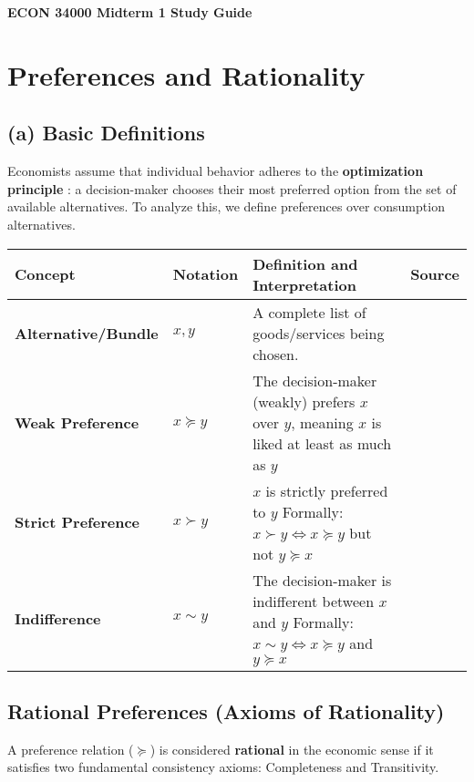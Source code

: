 \documentclass{article}
\begin{document}
\begin{center}
    {\Huge \textbf{ECON 34000 Midterm 1 Study Guide}}
\end{center}

\tableofcontents

\pagebreak
\section{Preferences and Rationality}

\subsection*{ (a) Basic Definitions}

Economists assume that individual behavior adheres to the \textbf{optimization principle} : a decision-maker chooses their most preferred option from the set of available alternatives. To analyze this, we define preferences over consumption alternatives.

\begin{center}
\begin{tabular}{>{\bfseries}l l p{11cm} l}
\toprule
\textbf{Concept} & \textbf{Notation} & \textbf{Definition and Interpretation} & \textbf{Source} \\
\midrule
Alternative/Bundle & $x, y$ & A complete list of goods/services being chosen. & \\
Weak Preference & $x \succeq y$ & The decision-maker (weakly) prefers $x$ over $y$, meaning $x$ is liked at least as much as $y$ & \\
Strict Preference & $x \succ y$ & $x$ is strictly preferred to $y$ Formally: $x \succ y \iff x \succeq y$ but not $y \succeq x$ & \\
Indifference & $x \sim y$ & The decision-maker is indifferent between $x$ and $y$ Formally: $x \sim y \iff x \succeq y$ and $y \succeq x$ & \\
\bottomrule


\end{tabular}


\end{center}

\subsection{Rational Preferences (Axioms of Rationality)}

A preference relation ($\succeq$) is considered \textbf{rational} in the economic sense if it satisfies two fundamental consistency axioms: Completeness and Transitivity.
\end{document}

